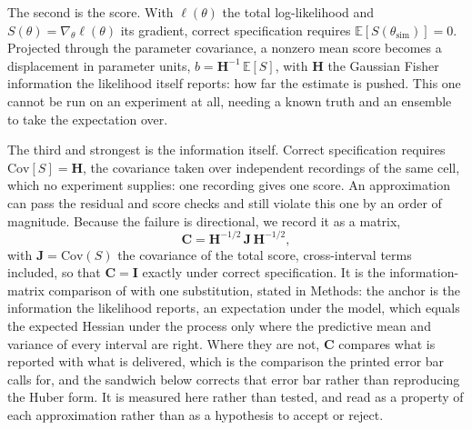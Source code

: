 The second is the score. With $\ell(\theta)$ the total log-likelihood and
$S(\theta)=\nabla_\theta\ell(\theta)$ its gradient, correct specification requires
$\mathbb{E}[S(\theta_{\mathrm{sim}})]=0$. Projected through the parameter covariance, a nonzero mean
score becomes a displacement in parameter units, $b=\mathbf{H}^{-1}\,\mathbb{E}[S]$, with
$\mathbf{H}$ the Gaussian Fisher information the likelihood itself reports: how far the estimate is
pushed. This one cannot be run on an experiment at all, needing a known truth and an ensemble to
take the expectation over.

The third and strongest is the information itself. Correct specification requires
$\mathrm{Cov}[S]=\mathbf{H}$, the covariance taken over independent recordings of the same cell,
which no experiment supplies: one recording gives one score. An approximation can pass the residual
and score checks and still violate this one by an order of magnitude. Because the failure is
directional, we record it as a matrix,
\[ \mathbf{C}=\mathbf{H}^{-1/2}\,\mathbf{J}\,\mathbf{H}^{-1/2}, \]
with $\mathbf{J}=\mathrm{Cov}(S)$ the covariance of the total score, cross-interval terms included,
so that $\mathbf{C}=\mathbf{I}$ exactly under correct specification. It is the information-matrix
comparison of \cite{white1982maximum} with one substitution, stated in Methods: the anchor is the
information the likelihood reports, an expectation under the model, which equals the expected
Hessian under the process only where the predictive mean and variance of every interval are right.
Where they are not, $\mathbf{C}$ compares what is reported with what is delivered, which is the
comparison the printed error bar calls for, and the sandwich below corrects that error bar rather
than reproducing the Huber form. It is measured here rather than tested, and read as a property of
each approximation rather than as a hypothesis to accept or reject.
